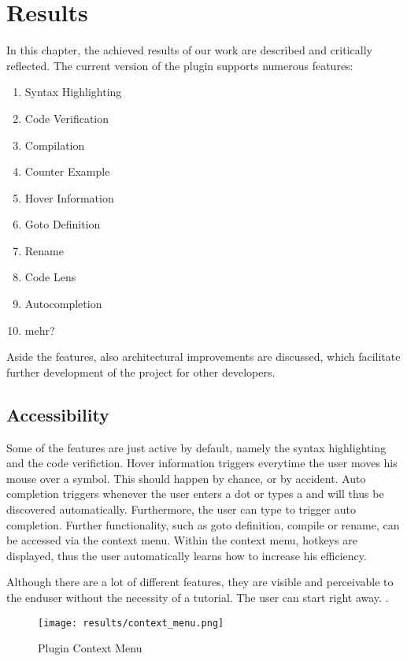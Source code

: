 \section{Results}

\label{section:results}
In this chapter, the achieved results of our work are described and critically reflected.
The current version of the plugin supports numerous features:
\begin{enumerate}
    \item Syntax Highlighting
    \item Code Verification
    \item Compilation
    \item Counter Example
    \item Hover Information
    \item Goto Definition
    \item Rename
    \item Code Lens
    \item Autocompletion
    \item mehr?
\end{enumerate}


Aside the features, also architectural improvements are discussed,
which facilitate further development of the project for other developers.


\subsection{Accessibility}
Some of the features are just active by default, namely the syntax highlighting and the code verifiction.
Hover information triggers everytime the user moves his mouse over a symbol.
This should happen by chance, or by accident.
Auto completion triggers whenever the user enters a dot or types a  and will thus be discovered automatically.
Furthermore, the user can type  to trigger auto completion.
Further functionality, such as goto definition, compile or rename, can be accessed via the context menu.
Within the context menu, hotkeys are displayed, thus the user automatically learns how to increase his efficiency.

Although there are a lot of different features, they are visible and perceivable to the enduser without the necessity of a tutorial.
The user can start right away. .

\begin{figure}[H]
    \centering
    \texttt{[image: results/context\_menu.png]}
    \caption{Plugin Context Menu}
    \label{fig:result_contextmenu}
\end{figure}

